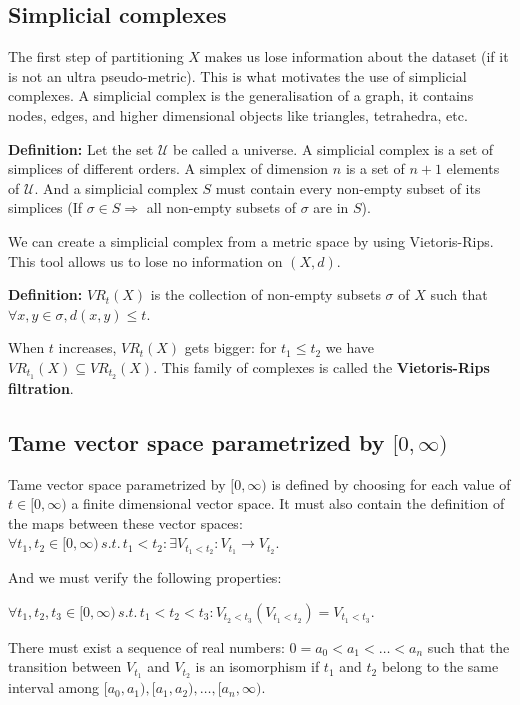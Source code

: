 \documentclass[11pt,a4paper]{article}
\begin{document}
\subsection{Simplicial complexes}
The first step of partitioning $X$ makes us lose information about the dataset (if it is not an ultra pseudo-metric). This is what motivates the use of simplicial complexes. A simplicial complex is the generalisation of a graph, it contains nodes, edges, and higher dimensional objects like triangles, tetrahedra, etc.

\textbf{Definition:}
Let the set $\mathcal{U}$ be called a universe.
A simplicial complex is a set of simplices of different orders. A simplex of dimension $n$ is a set of $n+1$ elements of $\mathcal{U}$. And a simplicial complex $S$ must contain every non-empty subset of its simplices (If $\sigma \in S \Rightarrow$ all non-empty subsets of $\sigma$ are in $S$).

We can create a simplicial complex from a metric space by using Vietoris-Rips. This tool allows us to lose no information on $(X,d)$.

\textbf{Definition:}
$VR_t(X)$ is the collection of non-empty subsets $\sigma$ of $X$ such that $\forall x,y \in \sigma, d(x,y)\leq t$.

When $t$ increases, $VR_t(X)$ gets bigger: for $t_1 \leq t_2$ we have $VR_{t_1}(X) \subseteq VR_{t_2}(X)$. This family of complexes is called the \textbf{Vietoris-Rips filtration}.


\subsection{Tame vector space parametrized by \texorpdfstring{$[0,\infty)$}{[0, infinity)}}
Tame vector space parametrized by $[0,\infty)$ is defined by choosing for each value of $t \in [0,\infty)$ a finite dimensional vector space. It must also contain the definition of the maps between these vector spaces: $\forall t_1, t_2 \in [0,\infty) \, s.t. \, t_1<t_2: \exists V_{t_1<t_2}: V_{t_1} \rightarrow V_{t_2}$.

And we must verify the following properties:

$\forall t_1, t_2, t_3 \in [0,\infty) \, s.t. \, t_1<t_2<t_3:  V_{t_2<t_3} (V_{t_1<t_2}) = V_{t_1<t_3}$.

There must exist a sequence of real numbers: $0=a_0<a_1<\dots<a_n$ such that the transition between $V_{t_1}$ and $V_{t_2}$ is an isomorphism if $t_1$ and $t_2$ belong to the same interval among $[a_0,a_1),[a_1,a_2),\dots,[a_n,\infty)$.
\end{document}
